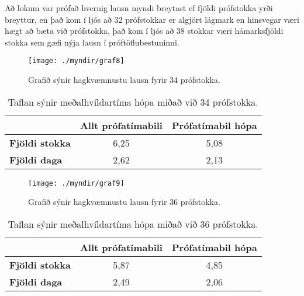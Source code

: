 \documentclass[12pt]{article}
\begin{document}
\newpage

Að lokum var prófað hvernig lausn myndi breytast ef fjöldi prófstokka yrði breyttur, en það kom í ljós að 32 prófstokkar er algjört lágmark en hinsvegar væri hægt að bæta við prófstokka, það kom í ljós að 38 stokkar væri hámarksfjöldi stokka sem gæfi nýja lausn í próftöflubestuninni.

\begin{figure}[h]
    \centering
    \texttt{[image: ./myndir/graf8]}
    \caption{Grafið sýnir hagkvæmnustu lausn fyrir 34 prófstokka.}
\end{figure}

\begin{table}[h]
    \centering
    \begin{tabular}{l|c|c|}
        \cline{2-3}
        & \multicolumn{1}{l|}{\textbf{Allt prófatímabili}} & \multicolumn{1}{l|}{\textbf{Prófatímabil hópa}} \\ \hline
        \multicolumn{1}{|l|}{\textbf{Fjöldi stokka}} & 6,25                                             & 5,08                                            \\ \hline
        \multicolumn{1}{|l|}{\textbf{Fjöldi daga}}   & 2,62                                             & 2,13                                            \\ \hline
    \end{tabular}
    \caption{Taflan sýnir meðalhvíldartíma hópa miðað við 34 prófstokka.}
\end{table}



\newpage
\begin{figure}[h]
    \centering
    \texttt{[image: ./myndir/graf9]}
    \caption{Grafið sýnir hagkvæmnustu lausn fyrir 36 prófstokka.}
\end{figure}

\begin{table}[h]
    \centering
    \begin{tabular}{l|c|c|}
        \cline{2-3}
        & \multicolumn{1}{l|}{\textbf{Allt prófatímabili}} & \multicolumn{1}{l|}{\textbf{Prófatímabil hópa}} \\ \hline
        \multicolumn{1}{|l|}{\textbf{Fjöldi stokka}} & 5,87                                             & 4,85                                            \\ \hline
        \multicolumn{1}{|l|}{\textbf{Fjöldi daga}}   & 2,49                                             & 2,06                                            \\ \hline
    \end{tabular}
    \caption{Taflan sýnir meðalhvíldartíma hópa miðað við 36 prófstokka.}
\end{table}
\end{document}
